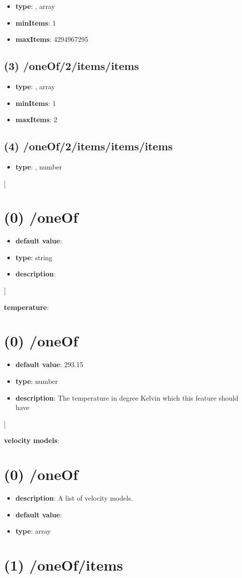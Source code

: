 \begin{itemize}[leftmargin=2em]\item {\bf type}: , array\item {\bf minItems}: 1
\item {\bf maxItems}: 4294967295
\end{itemize}\subsection{(3) /oneOf/2/items/items}
\begin{itemize}[leftmargin=3em]\item {\bf type}: , array\item {\bf minItems}: 1
\item {\bf maxItems}: 2
\end{itemize}\subsection{(4) /oneOf/2/items/items/items}
\begin{itemize}[leftmargin=4em]\item {\bf type}: , number\end{itemize}]\section{(0) /oneOf}
\begin{itemize}[leftmargin=0em]\item {\bf default value}: 
\item {\bf type}: string
\item {\bf description}: 
\end{itemize}]\item {\bf temperature}: \section{(0) /oneOf}
\begin{itemize}[leftmargin=0em]\item {\bf default value}: 293.15
\item {\bf type}: number
\item {\bf description}: The temperature in degree Kelvin which this feature should have
\end{itemize}]\item {\bf velocity models}: \section{(0) /oneOf}
\begin{itemize}[leftmargin=0em]\item {\bf description}: A list of velocity models.
\item {\bf default value}: 
\item {\bf type}: array
\end{itemize}\section{(1) /oneOf/items}

